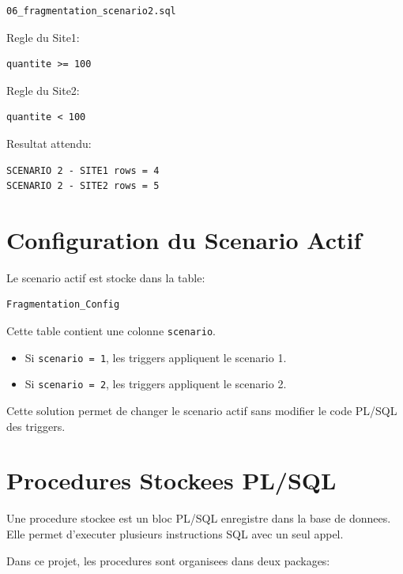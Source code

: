 \documentclass[12pt,a4paper]{report}
\begin{document}
\begin{lstlisting}[style=textstyle]
06_fragmentation_scenario2.sql
\end{lstlisting}

Regle du Site1:

\begin{lstlisting}[style=textstyle]
quantite >= 100
\end{lstlisting}

Regle du Site2:

\begin{lstlisting}[style=textstyle]
quantite < 100
\end{lstlisting}

Resultat attendu:

\begin{lstlisting}[style=textstyle]
SCENARIO 2 - SITE1 rows = 4
SCENARIO 2 - SITE2 rows = 5
\end{lstlisting}

\chapter{Configuration du Scenario Actif}

Le scenario actif est stocke dans la table:

\begin{lstlisting}[style=textstyle]
Fragmentation_Config
\end{lstlisting}

Cette table contient une colonne \texttt{scenario}.

\begin{itemize}
    \item Si \texttt{scenario = 1}, les triggers appliquent le scenario 1.
    \item Si \texttt{scenario = 2}, les triggers appliquent le scenario 2.
\end{itemize}

Cette solution permet de changer le scenario actif sans modifier le code PL/SQL des triggers.

\chapter{Procedures Stockees PL/SQL}

Une procedure stockee est un bloc PL/SQL enregistre dans la base de donnees. Elle permet d'executer plusieurs instructions SQL avec un seul appel.

Dans ce projet, les procedures sont organisees dans deux packages:
\end{document}
